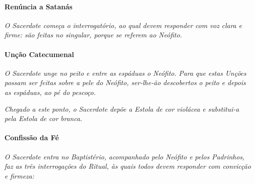 \documentclass[a5paper,10pt]{scrbook}
\begin{document}
\paragraph{Renúncia a Satanás}

\textit{O Sacerdote começa o interrogatório, ao qual devem responder com voz clara e firme: são feitas no singular, porque se referem ao Neófito.}

\begin{paracol}{2}\switchcolumn{}\switchcolumn*{}\switchcolumn{}\switchcolumn*{}\switchcolumn{}\switchcolumn*{}\switchcolumn{}\switchcolumn*{}\switchcolumn{}\switchcolumn*{}\switchcolumn{}\end{paracol}

\paragraph{Unção Catecumenal}

\textit{O Sacerdote unge no peito e entre as espáduas o Neófito. Para que estas Unções possam ser feitas sobre a pele do Neófito, ser-lhe-ão descobertos o peito e depois as espáduas, ao pé do pescoço.}

\begin{paracol}{2}\switchcolumn{}\switchcolumn*{}\switchcolumn{}\end{paracol}

\textit{Chegado a este ponto, o Sacerdote depõe a Estola de cor violácea e substitui-a pela Estola de cor branca.}

\paragraph{Confissão da Fé}

\textit{O Sacerdote entra no Baptistério, acompanhado pelo Neófito e pelos Padrinhos, faz as três interrogações do Ritual, às quais todos devem responder com convicção e firmeza:}
\end{document}

